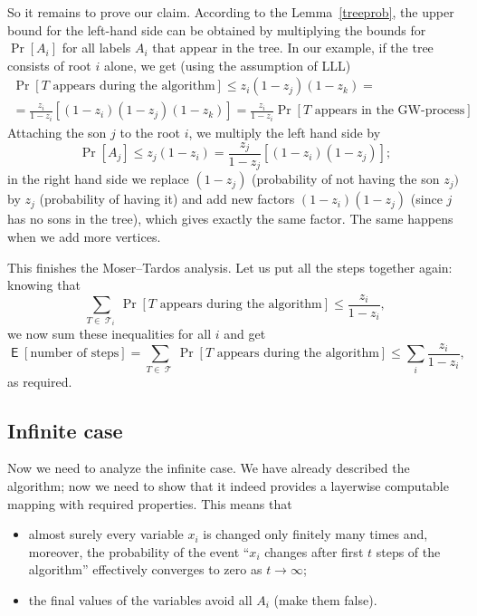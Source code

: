 \documentclass[12pt]{article}
\DeclareMathOperator{\Tr}{\mathcal{T}}
\DeclareMathOperator{\E}{\mathsf{E}}
\begin{document}
So it remains to prove our claim. According to the Lemma~\ref{treeprob}, the upper bound for the left-hand side can be obtained by multiplying the bounds for $\Pr[A_i]$ for all labels $A_i$ that appear in the tree.  In our example, if the tree consists of root $i$ alone, we get (using the assumption of LLL)
   \begin{multline*}
   \Pr[\text{$T$ appears during the algorithm}]\le z_i(1-z_j)(1-z_k)=\\
   = \frac{z_i}{1-z_i}[(1-z_i)(1-z_j)(1-z_k)] =
   \frac{z_i}{1-z_i}\Pr[\text{$T$ appears in the GW-process}]
   \end{multline*}
Attaching the son $j$ to the root $i$, we multiply the left hand side by
   $$
\Pr[A_j]\le z_j (1-z_i)=\frac{z_j}{1-z_j}[(1-z_i)(1-z_j)];
   $$
in the right hand side we replace $(1-z_j)$ (probability of not having the son $z_j)$ by $z_j$ (probability of having it) and add new factors $(1-z_i)(1-z_j)$ (since $j$ has no sons in the tree), which gives exactly the same factor. The same happens when we add more vertices.

This finishes the Moser--Tardos analysis. Let us put all the steps together again: knowing that
$$
   \sum_{T\in \Tr_i } \Pr[\text{$T$ appears during the algorithm}]\le \frac{z_i}{1-z_i},
$$
we now sum these inequalities for all $i$ and get
$$
\E[\text{number of steps}]=\sum_{T\in \Tr} \Pr[\text{$T$ appears during the algorithm}]\le \sum_i\frac{z_i}{1-z_i},
$$
as required.
\smallskip

\subsection{Infinite case}

Now we need to analyze the infinite case. We have already described the algorithm; now we need to show that it indeed provides a layerwise computable mapping with required properties. This means that

\begin{itemize}

\item
almost surely every variable $x_i$ is changed only finitely many times and, moreover, the probability of the event ``$x_i$ changes after first $t$ steps of the algorithm'' effectively converges to zero as $t\to\infty$;

\item
the final values of the variables avoid all $A_i$ (make them false).

\end{itemize}
\end{document}
